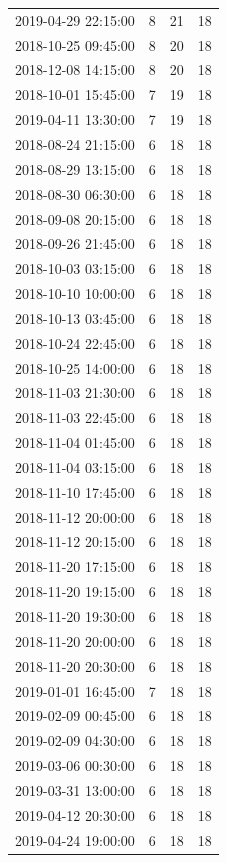 \begin{tabular}{lrrr}
2019-04-29 22:15:00 & 8 & 21 & 18 \\
2018-10-25 09:45:00 & 8 & 20 & 18 \\
2018-12-08 14:15:00 & 8 & 20 & 18 \\
2018-10-01 15:45:00 & 7 & 19 & 18 \\
2019-04-11 13:30:00 & 7 & 19 & 18 \\
2018-08-24 21:15:00 & 6 & 18 & 18 \\
2018-08-29 13:15:00 & 6 & 18 & 18 \\
2018-08-30 06:30:00 & 6 & 18 & 18 \\
2018-09-08 20:15:00 & 6 & 18 & 18 \\
2018-09-26 21:45:00 & 6 & 18 & 18 \\
2018-10-03 03:15:00 & 6 & 18 & 18 \\
2018-10-10 10:00:00 & 6 & 18 & 18 \\
2018-10-13 03:45:00 & 6 & 18 & 18 \\
2018-10-24 22:45:00 & 6 & 18 & 18 \\
2018-10-25 14:00:00 & 6 & 18 & 18 \\
2018-11-03 21:30:00 & 6 & 18 & 18 \\
2018-11-03 22:45:00 & 6 & 18 & 18 \\
2018-11-04 01:45:00 & 6 & 18 & 18 \\
2018-11-04 03:15:00 & 6 & 18 & 18 \\
2018-11-10 17:45:00 & 6 & 18 & 18 \\
2018-11-12 20:00:00 & 6 & 18 & 18 \\
2018-11-12 20:15:00 & 6 & 18 & 18 \\
2018-11-20 17:15:00 & 6 & 18 & 18 \\
2018-11-20 19:15:00 & 6 & 18 & 18 \\
2018-11-20 19:30:00 & 6 & 18 & 18 \\
2018-11-20 20:00:00 & 6 & 18 & 18 \\
2018-11-20 20:30:00 & 6 & 18 & 18 \\
2019-01-01 16:45:00 & 7 & 18 & 18 \\
2019-02-09 00:45:00 & 6 & 18 & 18 \\
2019-02-09 04:30:00 & 6 & 18 & 18 \\
2019-03-06 00:30:00 & 6 & 18 & 18 \\
2019-03-31 13:00:00 & 6 & 18 & 18 \\
2019-04-12 20:30:00 & 6 & 18 & 18 \\
2019-04-24 19:00:00 & 6 & 18 & 18 \\

\end{tabular}
